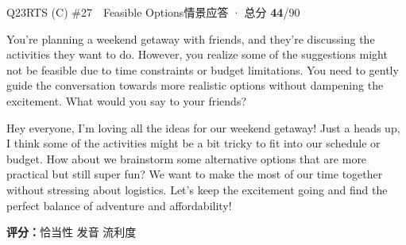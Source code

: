 \begin{qblock}{Q23\quad RTS (C) \#27\ \ Feasible Options}{情景应答 · 总分 \textcolor{cAccent}{\bfseries 44}/90}
\begin{promptbox}
You're planning a weekend getaway with friends, and they're discussing the activities they want to do. However, you realize some of the suggestions might not be feasible due to time constraints or budget limitations. You need to gently guide the conversation towards more realistic options without dampening the excitement. What would you say to your friends?
\end{promptbox}
\begin{modelbox}
Hey everyone, I'm loving all the ideas for our weekend getaway! Just a heads up, I think some of the activities might be a bit tricky to fit into our schedule or budget. How about we brainstorm some alternative options that are more practical but still super fun? We want to make the most of our time together without stressing about logistics. Let's keep the excitement going and find the perfect balance of adventure and affordability!
\end{modelbox}
\asrlegend
\begin{asrbox}
                                                      
\end{asrbox}
\smallskip
{\small\textbf{评分：}恰当性  \quad\textperiodcentered\quad 发音  \quad\textperiodcentered\quad 流利度 }
\end{qblock}

